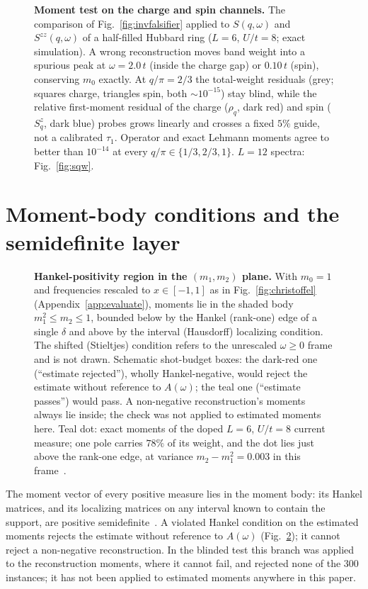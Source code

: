 \documentclass[submission, PhysCore]{SciPost}
\newcommand{\onecolfig}{\setlength{\columnwidth}{0.65\textwidth}}
\begin{document}
\begin{appendix}
\begin{figure}[t]
\centering\onecolfig

\caption{\textbf{Moment test on the charge and spin channels.} The comparison of Fig.~\ref{fig:invfalsifier} applied to $S(q,\omega)$ and $S^{zz}(q,\omega)$ of a half-filled Hubbard ring ($L=6$, $U/t=8$; exact simulation). A wrong reconstruction moves band weight into a spurious peak at $\omega=2.0\,t$ (inside the charge gap) or $0.10\,t$ (spin), conserving $m_0$ exactly. At $q/\pi=2/3$ the total-weight residuals (grey; squares charge, triangles spin, both ${\sim}10^{-15}$) stay blind, while the relative first-moment residual of the charge ($\rho_q$, dark red) and spin ($S^z_q$, dark blue) probes grows linearly and crosses a fixed $5\%$ guide, not a calibrated $\tau_1$. Operator and exact Lehmann moments agree to better than $10^{-14}$ at every $q/\pi\in\{1/3,2/3,1\}$. $L=12$ spectra: Fig.~\ref{fig:sqw}.}
\label{fig:collective_screen}
\end{figure}

\section{Moment-body conditions and the semidefinite layer}
\label{app:stack}
\label{sec:stack}
\begin{figure}[t]
\centering\onecolfig

\caption{\textbf{Hankel-positivity region in the $(m_1,m_2)$ plane.} With $m_0=1$ and frequencies rescaled to $x\in[-1,1]$ as in Fig.~\ref{fig:christoffel} (Appendix~\ref{app:evaluate}), moments lie in the shaded body $m_1^2\le m_2\le 1$, bounded below by the Hankel (rank-one) edge of a single $\delta$ and above by the interval (Hausdorff) localizing condition. The shifted (Stieltjes) condition refers to the unrescaled $\omega\ge0$ frame and is not drawn. Schematic shot-budget boxes: the dark-red one (``estimate rejected''), wholly Hankel-negative, would reject the estimate without reference to $A(\omega)$; the teal one (``estimate passes'') would pass. A non-negative reconstruction's moments always lie inside; the check was not applied to estimated moments here. Teal dot: exact moments of the doped $L=6$, $U/t=8$ current measure; one pole carries $78\%$ of its weight, and the dot lies just above the rank-one edge, at variance $m_2-m_1^2=0.003$ in this frame~\cite{ShohatTamarkin1943,Akhiezer1965}.}
\label{fig:momentcone}
\end{figure}

The moment vector of every positive measure lies in the moment body: its Hankel matrices, and its localizing matrices on any interval known to contain the support, are positive semidefinite~\cite{ShohatTamarkin1943,Akhiezer1965}. A violated Hankel condition on the estimated moments rejects the estimate without reference to $A(\omega)$ (Fig.~\ref{fig:momentcone}); it cannot reject a non-negative reconstruction. In the blinded test this branch was applied to the reconstruction moments, where it cannot fail, and rejected none of the $300$ instances; it has not been applied to estimated moments anywhere in this paper.


\end{appendix}
\end{document}
